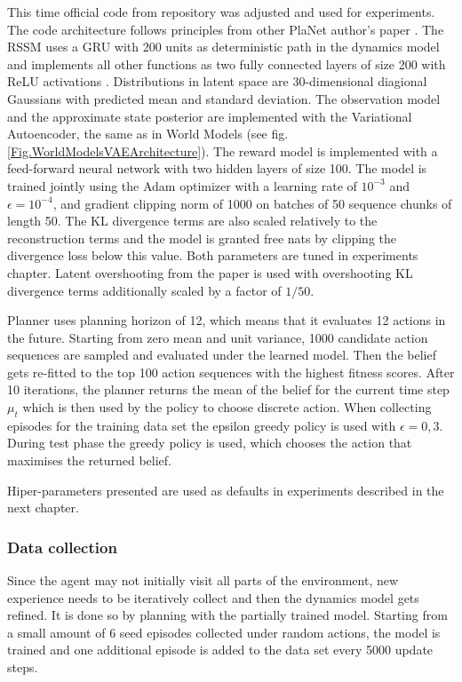 This time official code from repository \cite{Code.PlaNet} was adjusted and used for experiments. The code architecture follows principles from other PlaNet author's paper \cite{Code.TFAgents}.
The RSSM uses a GRU \cite{Algo.GRU} with 200 units as deterministic path in the dynamics model and implements all other functions as two fully connected layers of size 200 with ReLU activations \cite{Algo.ReLU}. Distributions in latent space are 30-dimensional diagional Gaussians with predicted mean and standard deviation.
The observation model and the approximate state posterior are implemented with the Variational Autoencoder, the same as in World Models (see fig.\ref{Fig.WorldModelsVAEArchitecture}). The reward model is implemented with a feed-forward neural network with two hidden layers of size 100.
The model is trained jointly using the Adam optimizer \cite{Algo.Adam} with a learning rate of $10^{-3}$ and $\epsilon = 10^{−4}$, and gradient clipping norm of 1000 on batches of 50 sequence chunks of length 50. The KL divergence terms are also scaled relatively to the reconstruction terms and the model is granted free nats by clipping the divergence loss below this value. Both parameters are tuned in experiments chapter. Latent overshooting from the paper \cite{Algo.PlaNet} is used with overshooting KL divergence terms additionally scaled by a factor of $1/50$.

Planner uses planning horizon of 12, which means that it evaluates 12 actions in the future. Starting from zero mean and unit variance, 1000 candidate action sequences are sampled and evaluated under the learned model. Then the belief gets re-fitted to the top 100 action sequences with the highest fitness scores. After 10 iterations, the planner returns the mean of the belief for the current time step $\mu_t$ which is then used by the policy to choose discrete action. When collecting episodes for the training data set the epsilon greedy policy is used with $\epsilon = 0,3$. During test phase the greedy policy is used, which chooses the action that maximises the returned belief.

Hiper-parameters presented are used as defaults in experiments described in the next chapter.

\subsubsection{Data collection}

Since the agent may not initially visit all parts of the environment, new experience needs to be iteratively collect and then the dynamics model gets refined. It is done so by planning with the partially trained model. Starting from a small amount of 6 seed episodes collected under random actions, the model is trained and one additional episode is added to the data set every 5000 update steps.

